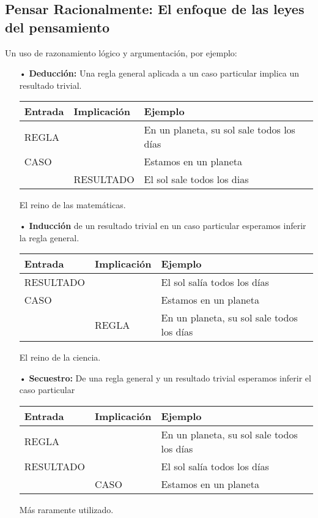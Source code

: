 \documentclass[12pt,a4paper]{book}
\begin{document}
\subsection{Pensar Racionalmente: El enfoque de las leyes del pensamiento}
Un uso de razonamiento lógico y argumentación, por ejemplo:
\begin{enumerate}
\item[•] \textbf{Deducción:} Una regla general aplicada a un caso particular implica un resultado trivial.
\begin{center}
\begin{tabular}{|l|l|l|}
\hline 
\textbf{Entrada} & \textbf{Implicación} & \textbf{Ejemplo} \\ 
\hline 
REGLA &  & En un planeta, su sol sale todos los días \\ 
\hline 
CASO &  & Estamos en un planeta \\ 
\hline 
 & RESULTADO & El sol sale todos los dias \\ 
\hline 
\end{tabular} 
\end{center}
El reino de las matemáticas.
\item[•] \textbf{Inducción} de un resultado trivial en un caso particular esperamos inferir la regla general.
\begin{center}
\begin{tabular}{|l|l|l|}
\hline 
\textbf{Entrada} & \textbf{Implicación} & \textbf{Ejemplo} \\ 
\hline 
RESULTADO &  & El sol salía todos los días \\ 
\hline 
CASO &  & Estamos en un planeta \\ 
\hline 
 & REGLA & En un planeta, su sol sale todos los días \\ 
\hline 
\end{tabular} 
\end{center}
El reino de la ciencia.
\item[•] \textbf{Secuestro:} De una regla general y un resultado trivial esperamos inferir el caso particular 
\begin{center}
\begin{tabular}{|l|l|l|}
\hline 
Entrada & Implicación & Ejemplo \\ 
\hline 
REGLA &  & En un planeta, su sol sale todos los días \\ 
\hline 
RESULTADO &  & El sol salía todos los días \\ 
\hline 
 & CASO & Estamos en un planeta \\ 
\hline 
\end{tabular} 
\end{center}
Más raramente utilizado.
\end{enumerate}
\end{document}
